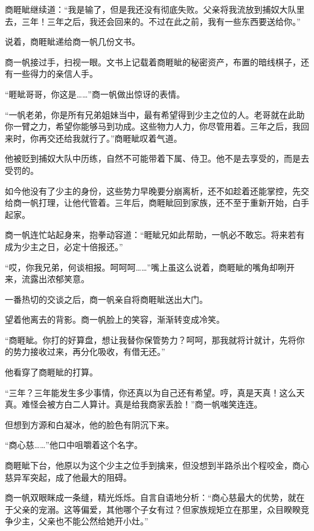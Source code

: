 
\begin{this_body}



商睚眦继续道：“我是输了，但是我还没有彻底失败。父亲将我流放到捕奴大队里去，三年！三年之后，我还会回来的。不过在此之前，我有一些东西要送给你。”

说着，商睚眦递给商一帆几份文书。

商一帆接过手，扫视一眼。文书上记载着商睚眦的秘密资产，布置的暗线棋子，还有一些得力的亲信人手。

“睚眦哥哥，你这是……”商一帆做出惊讶的表情。

“一帆老弟，你是所有兄弟姐妹当中，最有希望得到少主之位的人。老哥就在此助你一臂之力，希望你能够马到功成。这些物力人力，你尽管用着。三年之后，我回来时，你再交还给我就行了。”商睚眦叹着气道。

他被贬到捕奴大队中历练，自然不可能带着下属、侍卫。他不是去享受的，而是去受罚的。

如今他没有了少主的身份，这些势力早晚要分崩离析，还不如趁着还能掌控，先交给商一帆打理，让他代管着。三年后，商睚眦回到家族，还不至于重新开始，白手起家。

商一帆连忙站起身来，抱拳动容道：“睚眦兄如此帮助，一帆必不敢忘。将来若有成为少主之日，必定十倍报还。”

“哎，你我兄弟，何谈相报。呵呵呵……”嘴上虽这么说着，商睚眦的嘴角却咧开来，流露出浓郁笑意。

一番热切的交谈之后，商一帆亲自将商睚眦送出大门。

望着他离去的背影。商一帆脸上的笑容，渐渐转变成冷笑。

“商睚眦。你打的好算盘，想让我替你保管势力？呵呵，那我就将计就计，先将你的势力接收过来，再分化吸收，有借无还。”

他看穿了商睚眦的打算。

“三年？三年能发生多少事情，你还真以为自己还有希望。哼，真是天真！这么天真。难怪会被方白二人算计。真是给我商家丢脸！”商一帆嗤笑连连。

但想到方源和白凝冰，他的脸色有阴沉下来。

“商心慈……”他口中咀嚼着这个名字。

商睚眦下台，他原以为这个少主之位手到擒来，但没想到半路杀出个程咬金，商心慈异军突起，成了他最大的阻碍。

商一帆双眼眯成一条缝，精光烁烁。自言自语地分析：“商心慈最大的优势，就在于父亲的宠溺。这等偏爱，其他哪个子女有过？但家族规矩立在那里，众目睽睽竞争少主，父亲也不能公然给她开小灶。”


\end{this_body}
